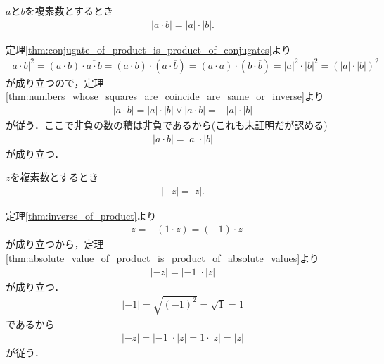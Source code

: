 	\begin{screen}
		\begin{thm}[積の絶対値は絶対値の積]
		\label{thm:absolute_value_of_product_is_product_of_absolute_values}
			$a$と$b$を複素数とするとき
			\begin{align}
				|a \cdot b| = |a| \cdot |b|.
			\end{align}
		\end{thm}
	\end{screen}
	
	\begin{sketch}
		定理\ref{thm:conjugate_of_product_is_product_of_conjugates}より
		\begin{align}
			|a \cdot b|^2 = (a \cdot b) \cdot \overline{a \cdot b}
			= (a \cdot b) \cdot (\overline{a} \cdot \overline{b})
			= (a \cdot \overline{a}) \cdot (b \cdot \overline{b})
			= |a|^2 \cdot |b|^2
			= (|a| \cdot |b|)^2
		\end{align}
		が成り立つので，定理\ref{thm:numbers_whose_squares_are_coincide_are_same_or_inverse}より
		\begin{align}
			|a \cdot b| = |a| \cdot |b| \vee |a \cdot b| = -|a| \cdot |b|
		\end{align}
		が従う．ここで非負の数の積は非負であるから(これも未証明だが認める)
		\begin{align}
			|a \cdot b| = |a| \cdot |b|
		\end{align}
		が成り立つ．
		\QED
	\end{sketch}
	
	\begin{screen}
		\begin{thm}[逆元の絶対値は等しい]
			$z$を複素数とするとき
			\begin{align}
				|-z| = |z|.
			\end{align}
		\end{thm}
	\end{screen}
	
	\begin{sketch}
		定理\ref{thm:inverse_of_product}より
		\begin{align}
			-z = -(1 \cdot z) = (-1) \cdot z
		\end{align}
		が成り立つから，定理\ref{thm:absolute_value_of_product_is_product_of_absolute_values}より
		\begin{align}
			|-z| = |-1| \cdot |z|
		\end{align}
		が成り立つ．
		\begin{align}
			|-1| = \sqrt{(-1)^2} = \sqrt{1} = 1
		\end{align}
		であるから
		\begin{align}
			|-z| = |-1| \cdot |z| = 1 \cdot |z| = |z|
		\end{align}
		が従う．
		\QED
	\end{sketch}
	
